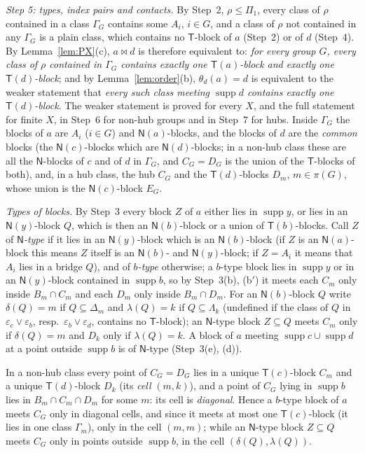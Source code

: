 \documentclass[11pt]{amsart}
\theoremstyle{definition}
\newcommand{\supp}{\operatorname{supp}}
\newcommand{\T}{\mathsf{T}}
\newcommand{\N}{\mathsf{N}}
\newcommand{\mt}{\bowtie}      %
\begin{document}
\smallskip
\emph{Step 5: types, index pairs and contacts.} By Step~2, $\rho\le\Pi_1$, every class of $\rho$ contained in a class $\Gamma_G$ contains some $A_i$, $i\in G$, and a class of $\rho$ not contained in any $\Gamma_G$ is a plain class, which contains no $\T$-block of $a$ (Step~2) or of $d$ (Step~4). By Lemma~\ref{lem:PX}(c), $a\mt d$ is therefore equivalent to: \emph{for every group $G$, every class of $\rho$ contained in $\Gamma_G$ contains exactly one $\T(a)$-block and exactly one $\T(d)$-block}; and by Lemma~\ref{lem:order}(b), $\theta_d(a)=d$ is equivalent to the weaker statement that \emph{every such class meeting $\supp d$ contains exactly one $\T(d)$-block}. The weaker statement is proved for every $X$, and the full statement for finite $X$, in Step~6 for non-hub groups and in Step~7 for hubs. Inside $\Gamma_G$ the blocks of $a$ are $A_i$ ($i\in G$) and $\N(a)$-blocks, and the blocks of $d$ are the \emph{common} blocks (the $\N(c)$-blocks which are $\N(d)$-blocks; in a non-hub class these are all the $\N$-blocks of $c$ and of $d$ in $\Gamma_G$, and $C_G=D_G$ is the union of the $\T$-blocks of both), and, in a hub class, the hub $C_G$ and the $\T(d)$-blocks $D_m$, $m\in\pi(G)$, whose union is the $\N(c)$-block $E_G$.

\emph{Types of blocks.} By Step~3 every block $Z$ of $a$ either lies in $\supp y$, or lies in an $\N(y)$-block $Q$, which is then an $\N(b)$-block or a union of $\T(b)$-blocks. Call $Z$ of \emph{$\N$-type} if it lies in an $\N(y)$-block which is an $\N(b)$-block (if $Z$ is an $\N(a)$-block this means $Z$ itself is an $\N(b)$- and $\N(y)$-block; if $Z=A_i$ it means that $A_i$ lies in a bridge $Q$), and of \emph{$b$-type} otherwise; a $b$-type block lies in $\supp y$ or in an $\N(y)$-block contained in $\supp b$, so by Step~3(b), (b$'$) it meets each $C_m$ only inside $B_m\cap C_m$ and each $D_m$ only inside $B_m\cap D_m$. For an $\N(b)$-block $Q$ write $\delta(Q)=m$ if $Q\subseteq\Delta_m$ and $\lambda(Q)=k$ if $Q\subseteq\Lambda_k$ (undefined if the class of $Q$ in $\varepsilon_c\vee\varepsilon_b$, resp.\ $\varepsilon_b\vee\varepsilon_d$, contains no $\T$-block); an $\N$-type block $Z\subseteq Q$ meets $C_m$ only if $\delta(Q)=m$ and $D_k$ only if $\lambda(Q)=k$. A block of $a$ meeting $\supp c\cup\supp d$ at a point outside $\supp b$ is of $\N$-type (Step~3(e), (d)).

In a non-hub class every point of $C_G=D_G$ lies in a unique $\T(c)$-block $C_m$ and a unique $\T(d)$-block $D_k$ (its \emph{cell} $(m,k)$), and a point of $C_G$ lying in $\supp b$ lies in $B_m\cap C_m\cap D_m$ for some $m$: its cell is \emph{diagonal}. Hence a $b$-type block of $a$ meets $C_G$ only in diagonal cells, and since it meets at most one $\T(c)$-block (it lies in one class $\Gamma_m$), only in the cell $(m,m)$; while an $\N$-type block $Z\subseteq Q$ meets $C_G$ only in points outside $\supp b$, in the cell $(\delta(Q),\lambda(Q))$.
\end{document}
